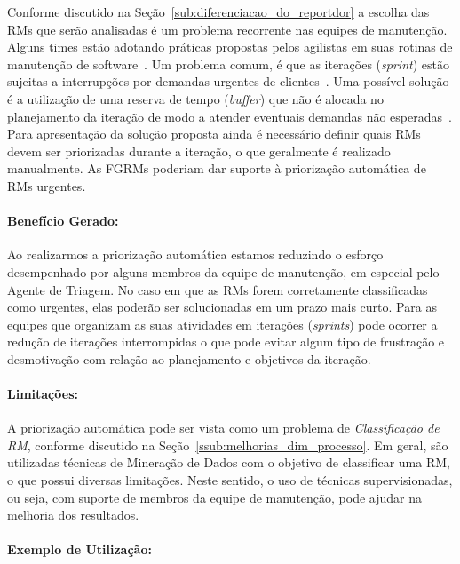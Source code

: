 Conforme discutido na Seção~\ref{sub:diferenciacao_do_reportdor} a escolha das
RMs que serão analisadas é um problema recorrente nas equipes de manutenção.
Alguns times estão adotando práticas propostas pelos agilistas em suas rotinas
de manutenção de software~\cite{svensson2005introducing}. Um problema comum, é
que as iterações (\textit{sprint}) estão sujeitas a interrupções por demandas
urgentes de clientes~\cite{bennett2000software}. Uma possível solução é a
utilização de uma reserva de tempo (\textit{buffer}) que não é alocada no
planejamento da iteração de modo a atender eventuais demandas não
esperadas~\cite{schwaber2002agile}. Para apresentação da solução proposta ainda
é necessário definir quais RMs devem ser priorizadas durante a iteração, o que
geralmente é realizado manualmente. As FGRMs poderiam dar suporte à priorização
automática de RMs urgentes.

\paragraph{Benefício Gerado:}
\label{par:papéis_afetados_s07}

Ao realizarmos a priorização automática estamos reduzindo o esforço desempenhado
por alguns membros da equipe de manutenção, em especial pelo Agente de Triagem.
No caso em que as RMs forem corretamente classificadas como urgentes, elas
poderão ser solucionadas em um prazo mais curto. Para as equipes que organizam
as suas atividades em iterações (\textit{sprints}) pode ocorrer a redução de
iterações interrompidas o que pode evitar algum tipo de frustração e
desmotivação com relação ao planejamento e objetivos da iteração.

\paragraph{Limitações:}
\label{par:limitacoes_s07}

A priorização automática pode ser vista como um problema de
\textit{Classificação de RM}, conforme discutido na
Seção~\ref{ssub:melhorias_dim_processo}. Em geral, são utilizadas técnicas de
Mineração de Dados com o objetivo de classificar uma RM, o que possui diversas
limitações. Neste sentido, o uso de técnicas supervisionadas, ou seja, com
suporte de membros da equipe de manutenção, pode ajudar na melhoria dos
resultados.

\paragraph{Exemplo de Utilização:}
\label{par:exemplo_de_utilização_s07}


